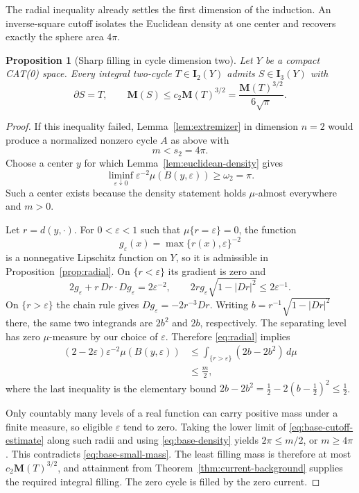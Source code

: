 \documentclass[11pt]{article}
\numberwithin{equation}{section}
\newtheorem{proposition}[theorem]{Proposition}
\theoremstyle{definition}
\theoremstyle{remark}
\begin{document}
The radial inequality already settles the first dimension of the
induction. An inverse-square cutoff isolates the Euclidean density at
one center and recovers exactly the sphere area $4\pi$.

\begin{proposition}[Sharp filling in cycle dimension two]
\label{prop:base}
Let $Y$ be a compact CAT(0) space.  Every integral two-cycle
$T\in\mathbf I_2(Y)$ admits $S\in\mathbf I_3(Y)$ with
\[
 \partial S=T,\qquad
 \mathbf M(S)\leq c_2\mathbf M(T)^{3/2}
          =\frac{\mathbf M(T)^{3/2}}{6\sqrt{\pi}}.
\]
\end{proposition}

\begin{proof}
If this inequality failed, Lemma~\ref{lem:extremizer} in dimension
$n=2$ would produce a normalized nonzero cycle $A$ as above with
\begin{equation}
 m<s_2=4\pi.
 \label{eq:base-small-mass}
\end{equation}
Choose a center $y$ for which Lemma~\ref{lem:euclidean-density}
gives
\begin{equation}
 \liminf_{\varepsilon\downarrow0}
 \varepsilon^{-2}\mu(B(y,\varepsilon))\geq\omega_2=\pi.
 \label{eq:base-density}
\end{equation}
Such a center exists because the density statement holds
$\mu$-almost everywhere and $m>0$.

Let $r=d(y,\cdot)$.  For $0<\varepsilon<1$ such that
$\mu\{r=\varepsilon\}=0$, the function
\[
 g_\varepsilon(x)=\max\{r(x),\varepsilon\}^{-2}
\]
is a nonnegative Lipschitz function on $Y$, so it is admissible
in Proposition~\ref{prop:radial}.  On $\{r<\varepsilon\}$ its
gradient is zero and
\[
 2g_\varepsilon+r\,Dr\cdot Dg_\varepsilon
 =2\varepsilon^{-2},\qquad
 2rg_\varepsilon\sqrt{1-|Dr|^2}
 \leq 2\varepsilon^{-1}.
\]
On $\{r>\varepsilon\}$ the chain rule gives
$Dg_\varepsilon=-2r^{-3}Dr$.  Writing
$b=r^{-1}\sqrt{1-|Dr|^2}$ there, the same two integrands are
$2b^2$ and $2b$, respectively.  The separating level has zero
$\mu$-measure by our choice of $\varepsilon$.  Therefore
\eqref{eq:radial} implies
\begin{align}
 (2-2\varepsilon)\varepsilon^{-2}\mu(B(y,\varepsilon))
 &\leq\int_{\{r>\varepsilon\}}(2b-2b^2)\,d\mu\\
 &\leq \frac{m}{2},
 \label{eq:base-cutoff-estimate}
\end{align}
where the last inequality is the elementary bound
$2b-2b^2=\tfrac12-2(b-\tfrac12)^2\leq\tfrac12$.

Only countably many levels of a real function can carry positive
mass under a finite measure, so eligible $\varepsilon$ tend to
zero.  Taking the lower limit of
\eqref{eq:base-cutoff-estimate} along such radii and using
\eqref{eq:base-density} yields $2\pi\leq m/2$, or $m\geq4\pi$.
This contradicts \eqref{eq:base-small-mass}.  The least filling
mass is therefore at most $c_2\mathbf M(T)^{3/2}$, and attainment from
Theorem~\ref{thm:current-background} supplies the required
integral filling.  The zero cycle is filled by the zero current.
\end{proof}
\end{document}
